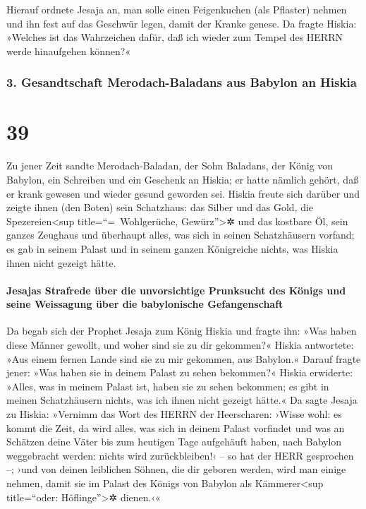 Hierauf ordnete Jesaja an, man solle einen Feigenkuchen
(als Pflaster) nehmen und ihn fest auf das Geschwür legen, damit der
Kranke genese. Da fragte Hiskia: »Welches ist das
Wahrzeichen dafür, daß ich wieder zum Tempel des HERRN werde hinaufgehen
können?«

\hypertarget{gesandtschaft-merodach-baladans-aus-babylon-an-hiskia}{%
\subsubsection{3. Gesandtschaft Merodach-Baladans aus Babylon an
Hiskia}\label{gesandtschaft-merodach-baladans-aus-babylon-an-hiskia}}

\hypertarget{section-38}{%
\section{39}\label{section-38}}

Zu jener Zeit sandte Merodach-Baladan, der Sohn Baladans,
der König von Babylon, ein Schreiben und ein Geschenk an Hiskia; er
hatte nämlich gehört, daß er krank gewesen und wieder gesund geworden
sei. Hiskia freute sich darüber und zeigte ihnen (den
Boten) sein Schatzhaus: das Silber und das Gold, die
Spezereien\textless sup title=``=~Wohlgerüche, Gewürz''\textgreater✲ und
das kostbare Öl, sein ganzes Zeughaus und überhaupt alles, was sich in
seinen Schatzhäusern vorfand; es gab in seinem Palast und in seinem
ganzen Königreiche nichts, was Hiskia ihnen nicht gezeigt hätte.

\hypertarget{jesajas-strafrede-uxfcber-die-unvorsichtige-prunksucht-des-kuxf6nigs-und-seine-weissagung-uxfcber-die-babylonische-gefangenschaft}{%
\paragraph{Jesajas Strafrede über die unvorsichtige Prunksucht des
Königs und seine Weissagung über die babylonische
Gefangenschaft}\label{jesajas-strafrede-uxfcber-die-unvorsichtige-prunksucht-des-kuxf6nigs-und-seine-weissagung-uxfcber-die-babylonische-gefangenschaft}}

Da begab sich der Prophet Jesaja zum König Hiskia und
fragte ihn: »Was haben diese Männer gewollt, und woher sind sie zu dir
gekommen?« Hiskia antwortete: »Aus einem fernen Lande sind sie zu mir
gekommen, aus Babylon.« Darauf fragte jener: »Was haben
sie in deinem Palast zu sehen bekommen?« Hiskia erwiderte: »Alles, was
in meinem Palast ist, haben sie zu sehen bekommen; es gibt in meinen
Schatzhäusern nichts, was ich ihnen nicht gezeigt hätte.«
Da sagte Jesaja zu Hiskia: »Vernimm das Wort des HERRN der
Heerscharen: ›Wisse wohl: es kommt die Zeit, da wird
alles, was sich in deinem Palast vorfindet und was an Schätzen deine
Väter bis zum heutigen Tage aufgehäuft haben, nach Babylon weggebracht
werden: nichts wird zurückbleiben!‹ -- so hat der HERR gesprochen --;
›und von deinen leiblichen Söhnen, die dir geboren werden,
wird man einige nehmen, damit sie im Palast des Königs von Babylon als
Kämmerer\textless sup title=``oder: Höflinge''\textgreater✲ dienen.‹«


